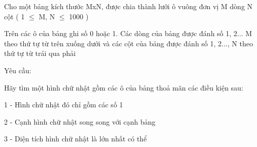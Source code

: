 Cho một bảng kích thước MxN, được chia thành lưới ô vuông đơn vị M dòng N cột ( 1  $\le$  M, N  $\le$  1000 )  

   Trên các ô của bảng ghi số 0 hoặc 1. Các dòng của bảng được đánh số 1, 2... M theo thứ tự từ trên xuống dưới và các cột của bảng được đánh số 1, 2..., N theo thứ tự từ trái qua phải  

   Yêu cầu:  

   Hãy tìm một hình chữ nhật gồm các ô của bảng thoả mãn các điều kiện sau:  

   1 - Hình chữ nhật đó chỉ gồm các số 1  

   2 - Cạnh hình chữ nhật song song với cạnh bảng  

   3 - Diện tích hình chữ nhật là lớn nhất có thể